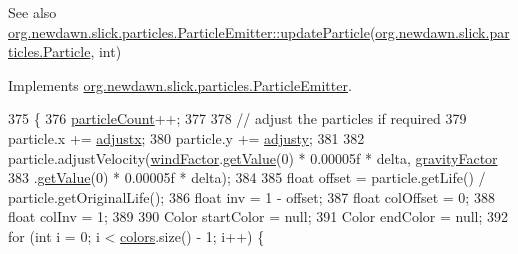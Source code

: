 \begin{DoxySeeAlso}{See also}
\mbox{\hyperlink{interfaceorg_1_1newdawn_1_1slick_1_1particles_1_1_particle_emitter_ac0792f19fdebd62a321bcdc487e0cba5}{org.\+newdawn.\+slick.\+particles.\+Particle\+Emitter\+::update\+Particle}}(\mbox{\hyperlink{classorg_1_1newdawn_1_1slick_1_1particles_1_1_particle}{org.\+newdawn.\+slick.\+particles.\+Particle}}, int) 
\end{DoxySeeAlso}


Implements \mbox{\hyperlink{interfaceorg_1_1newdawn_1_1slick_1_1particles_1_1_particle_emitter_ac0792f19fdebd62a321bcdc487e0cba5}{org.\+newdawn.\+slick.\+particles.\+Particle\+Emitter}}.


\begin{DoxyCode}
375                                                              \{
376         \mbox{\hyperlink{classorg_1_1newdawn_1_1slick_1_1particles_1_1_configurable_emitter_a58b2c979b10877d5ace8133d3950fe9e}{particleCount}}++;
377         
378         \textcolor{comment}{// adjust the particles if required}
379         particle.x += \mbox{\hyperlink{classorg_1_1newdawn_1_1slick_1_1particles_1_1_configurable_emitter_ab50941d712d03e4db8f041b84bd66380}{adjustx}};
380         particle.y += \mbox{\hyperlink{classorg_1_1newdawn_1_1slick_1_1particles_1_1_configurable_emitter_a9ee9e6c4ac0676c59439b5e93e567873}{adjusty}};
381 
382         particle.adjustVelocity(\mbox{\hyperlink{classorg_1_1newdawn_1_1slick_1_1particles_1_1_configurable_emitter_a0b2b2fcff95db03cf39c1ad5911b5176}{windFactor}}.\mbox{\hyperlink{classorg_1_1newdawn_1_1slick_1_1particles_1_1_configurable_emitter_1_1_simple_value_a427ab1df90b809a575492d6e55e7357b}{getValue}}(0) * 0.00005f * delta, 
      \mbox{\hyperlink{classorg_1_1newdawn_1_1slick_1_1particles_1_1_configurable_emitter_a70357a5c44e704c90f3a0b905978d3c8}{gravityFactor}}
383                 .\mbox{\hyperlink{classorg_1_1newdawn_1_1slick_1_1particles_1_1_configurable_emitter_1_1_simple_value_a427ab1df90b809a575492d6e55e7357b}{getValue}}(0) * 0.00005f * delta);
384         
385         \textcolor{keywordtype}{float} offset = particle.getLife() / particle.getOriginalLife();
386         \textcolor{keywordtype}{float} inv = 1 - offset;
387         \textcolor{keywordtype}{float} colOffset = 0;
388         \textcolor{keywordtype}{float} colInv = 1;
389 
390         Color startColor = null;
391         Color endColor = null;
392         \textcolor{keywordflow}{for} (\textcolor{keywordtype}{int} i = 0; i < \mbox{\hyperlink{classorg_1_1newdawn_1_1slick_1_1particles_1_1_configurable_emitter_ae21dcdf76a4ba4cf50f4c2bc1bc7ebaa}{colors}}.size() - 1; i++) \{

\end{DoxyCode}
